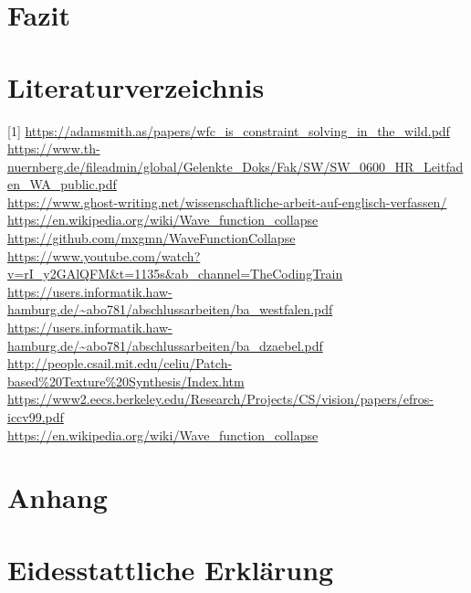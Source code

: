 \documentclass[12pt]{report}
\begin{document}
{\let\clearpage\relax\chapter{Fazit}}

{\let\clearpage\relax\chapter{Literaturverzeichnis}}
{[1]} \url{https://adamsmith.as/papers/wfc_is_constraint_solving_in_the_wild.pdf}\\
\url{https://www.th-nuernberg.de/fileadmin/global/Gelenkte_Doks/Fak/SW/SW_0600_HR_Leitfaden_WA_public.pdf}\\
\url{https://www.ghost-writing.net/wissenschaftliche-arbeit-auf-englisch-verfassen/}\\
\url{https://en.wikipedia.org/wiki/Wave_function_collapse}\\
\url{https://github.com/mxgmn/WaveFunctionCollapse}\\
\url{https://www.youtube.com/watch?v=rI_y2GAlQFM&t=1135s&ab_channel=TheCodingTrain}\\
\url{https://users.informatik.haw-hamburg.de/~abo781/abschlussarbeiten/ba_westfalen.pdf}\\
\url{https://users.informatik.haw-hamburg.de/~abo781/abschlussarbeiten/ba_dzaebel.pdf}\\
\url{http://people.csail.mit.edu/celiu/Patch-based%20Texture%20Synthesis/Index.htm}\\
\url{https://www2.eecs.berkeley.edu/Research/Projects/CS/vision/papers/efros-iccv99.pdf}\\
\url{https://en.wikipedia.org/wiki/Wave_function_collapse}\\


{\let\clearpage\relax\chapter{Anhang}}
{\let\clearpage\relax\chapter{Eidesstattliche Erklärung}}
\end{document}
